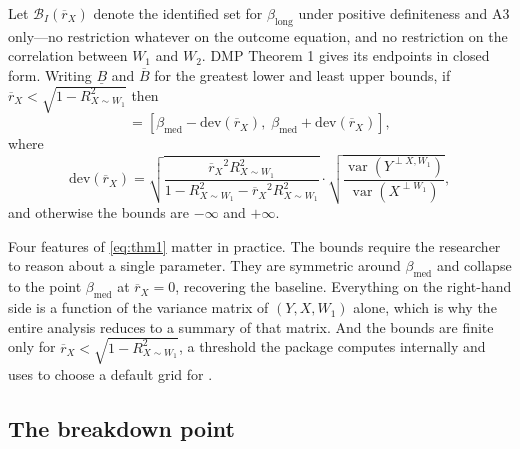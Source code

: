 \documentclass[article]{jss}\usepackage[]{graphicx}\usepackage[]{xcolor}
\newcommand{\blong}{\beta_{\mathrm{long}}}
\newcommand{\bmed}{\beta_{\mathrm{med}}}
\newcommand{\rxbar}{\ensuremath{\overline{r}_X}}
\newcommand{\Rsq}[1]{\ensuremath{R^2_{#1}}}
\newcommand{\Var}{\operatorname{var}}
\begin{document}
Let $\mathcal{B}_I(\rxbar)$ denote the identified set for $\blong$ under
positive definiteness and A3 only---no restriction whatever on the outcome
equation, and no restriction on the correlation between $W_1$ and $W_2$.
DMP Theorem 1 gives its endpoints in closed form. Writing
$\underline{B}$ and $\overline{B}$ for the greatest lower and least upper
bounds, if $\rxbar < \sqrt{1 - \Rsq{X \sim W_1}}$ then
\begin{equation}
[\underline{B}(\rxbar), \overline{B}(\rxbar)]
= \left[\bmed - \mathrm{dev}(\rxbar),\;
        \bmed + \mathrm{dev}(\rxbar)\right],
\label{eq:thm1}
\end{equation}
where
\begin{equation}
\mathrm{dev}(\rxbar)
= \sqrt{\frac{\rxbar^2 \Rsq{X \sim W_1}}
             {1 - \Rsq{X \sim W_1} - \rxbar^2 \Rsq{X \sim W_1}}}
  \cdot
  \sqrt{\frac{\Var(Y^{\perp X, W_1})}{\Var(X^{\perp W_1})}},
\label{eq:dev}
\end{equation}
and otherwise the bounds are $-\infty$ and $+\infty$.

Four features of \eqref{eq:thm1} matter in practice. The bounds require the
researcher to reason about a single parameter. They are symmetric around
$\bmed$ and collapse to the point $\bmed$ at $\rxbar = 0$, recovering the
baseline. Everything on the right-hand side is a function of the variance
matrix of $(Y, X, W_1)$ alone, which is why the entire analysis reduces to
a summary of that matrix. And the bounds are finite only for
$\rxbar < \sqrt{1 - \Rsq{X \sim W_1}}$, a threshold the package computes
internally and uses to choose a default grid for .

\subsection{The breakdown point}\label{sec:bp}
\end{document}
